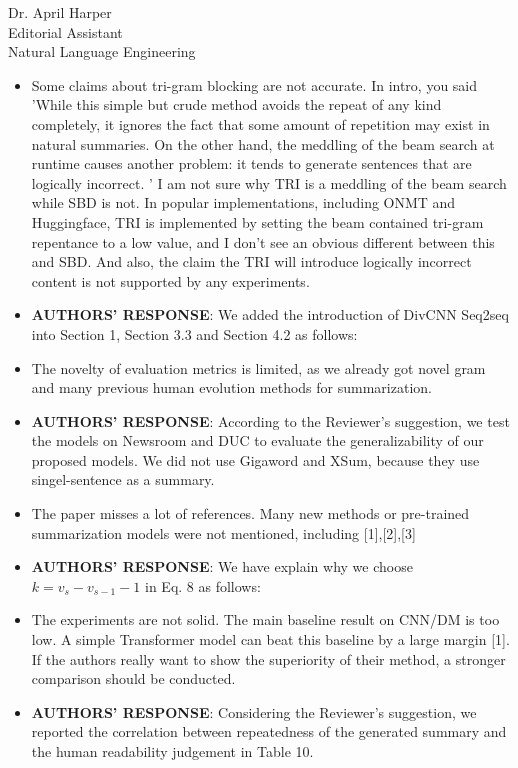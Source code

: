 \documentclass[11pt]{letter} %
\theoremstyle{definition}
\begin{document}
\begin{letter}{Dr. April Harper \\
            Editorial Assistant \\
			Natural Language Engineering}
\begin{enumerate}
\begin{itemize}
				\item Some claims about tri-gram blocking are not accurate. In intro, you said 'While this simple but crude method avoids the repeat of any kind completely, it ignores the fact that some amount of repetition may exist in natural summaries. On the other hand, the meddling of the beam search at runtime causes another problem: it tends to generate sentences that are logically incorrect. ' I am not sure why TRI is a meddling of the beam search while SBD is not. In popular implementations, including ONMT and Huggingface, TRI is implemented by setting the beam contained tri-gram repentance to a low value, and I don't see an obvious different between this and SBD. And also, the claim the TRI will introduce logically incorrect content is not supported by any experiments.
				\item[] \textbf{AUTHORS' RESPONSE}:  
                We added the introduction of DivCNN Seq2seq into Section 1, Section 3.3 and Section 4.2
                as follows:
         
                              
				\item The novelty of evaluation metrics is limited, as we already got novel gram and many previous human evolution methods for summarization.
				\item[] \textbf{AUTHORS' RESPONSE}:  
                According to the Reviewer's suggestion, we test the models on Newsroom and DUC to evaluate the generalizability of our proposed models.
                We did not use Gigaword and XSum, because they use singel-sentence as a summary.  
              

				\item The paper misses a lot of references. Many new methods or pre-trained summarization models were not mentioned, including [1],[2],[3]
				\item[] \textbf{AUTHORS' RESPONSE}:  
				We have explain why we choose $k=v_{s}-v_{s-1}-1$ in Eq. 8 as follows:
				
	

                \item The experiments are not solid. The main baseline result on CNN/DM is too low. A simple Transformer model can beat this baseline by a large margin [1]. If the authors really want to show the superiority of their method, a stronger comparison should be conducted.
				\item[] \textbf{AUTHORS' RESPONSE}:  
				Considering the Reviewer's suggestion, we reported the correlation between repeatedness of the generated summary and the human readability judgement
				in Table 10.
				

\end{itemize}
\end{enumerate}
\end{letter}
\end{document}
